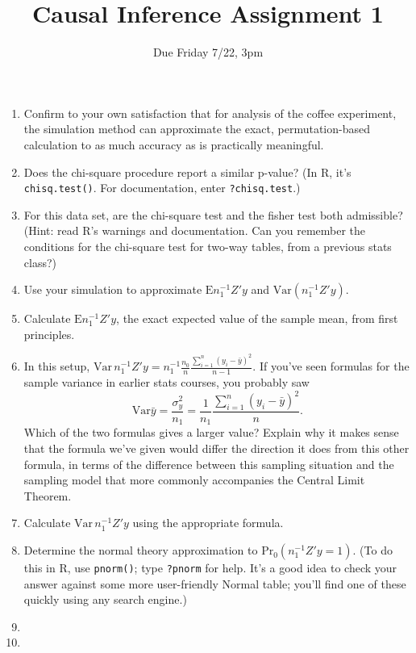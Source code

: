 \documentclass{article}
\title{Causal Inference Assignment 1}
\author{Due Friday 7/22, 3pm}
\begin{document}
\maketitle

\begin{enumerate}
\item Confirm to your own satisfaction that for analysis of the coffee experiment, the simulation method can approximate the exact, permutation-based calculation to as much accuracy as is practically meaningful.
\item Does the chi-square procedure report a similar p-value?  (In R,
  it's \texttt{chisq.test()}. For documentation, enter \texttt{?chisq.test}.)
\item For this data set, are the chi-square test and the fisher test
  both admissible? (Hint: read R's warnings and documentation.  Can
  you remember the conditions for the chi-square test for two-way
  tables, from a previous stats class?)
\item Use your simulation to approximate $\mathrm{E} n_{1}^{-1}Z'y $ and
  $\mathrm{Var}(n_{1}^{-1}Z'y) $. 
\item Calculate $\mathrm{E}  n_{1}^{-1}Z'y $, the exact expected value of the
  sample mean, from first principles.  
\item In this setup, $\mathrm{Var}\, n_{1}^{-1}Z'y  = n_{1}^{-1}
  \frac{n_{0}}{n} \frac{\sum_{i=1}^{n} (y_{i} - \bar y)^{2}}{n-1} $.
  If you've seen formulas for the sample variance in earlier stats
  courses, you probably saw
  $$
  \mathrm{Var} \bar{y} = \frac{\sigma_{y}^{2}}{n_{1}} = \frac{1}{n_{1}}
  \frac{\sum_{i=1}^{n} (y_{i} - \bar y)^{2}}{n} .
  $$
Which of the two formulas gives a larger value?  Explain why it makes
sense that the formula we've given would differ the direction it does
from this other formula, in terms of the difference between this
sampling situation and the sampling model that more commonly
accompanies the Central Limit Theorem.
\item Calculate $ \mathrm{Var}\, n_{1}^{-1}Z'y $ using the appropriate
  formula. 
\item Determine the normal theory approximation to
  $\mathrm{Pr}_{0}(n_{1}^{-1}Z'y =1 ) $.  (To do this in R, use
  \texttt{pnorm()}; type \texttt{?pnorm} for help. It's a good idea to
  check your answer against some 
  more user-friendly Normal table; you'll find one of these quickly
  using any search engine.)
\item

\item

\end{enumerate}
\end{document}
